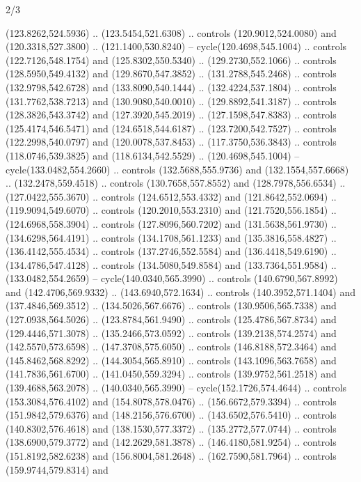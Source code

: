 \begin{flagdescription}{2/3}
\begin{scope}
\begin{scope}[xshift=0.45\flagwidth*\stretchfactor]
\begin{scope}[xshift=-0.45\flagwidth,yshift=\flagwidth,scale=0.0016667\flagwidth]
\begin{scope}[y=1pt, x=1pt, yscale=-1]
  (123.8262,524.5936) .. (123.5454,521.6308) .. controls (120.9012,524.0080) and
  (120.3318,527.3800) .. (121.1400,530.8240) -- cycle(120.4698,545.1004) ..
  controls (122.7126,548.1754) and (125.8302,550.5340) .. (129.2730,552.1066) ..
  controls (128.5950,549.4132) and (129.8670,547.3852) .. (131.2788,545.2468) ..
  controls (132.9798,542.6728) and (133.8090,540.1444) .. (132.4224,537.1804) ..
  controls (131.7762,538.7213) and (130.9080,540.0010) .. (129.8892,541.3187) ..
  controls (128.3826,543.3742) and (127.3920,545.2019) .. (127.1598,547.8383) ..
  controls (125.4174,546.5471) and (124.6518,544.6187) .. (123.7200,542.7527) ..
  controls (122.2998,540.0797) and (120.0078,537.8453) .. (117.3750,536.3843) ..
  controls (118.0746,539.3825) and (118.6134,542.5529) .. (120.4698,545.1004) --
  cycle(133.0482,554.2660) .. controls (132.5688,555.9736) and
  (132.1554,557.6668) .. (132.2478,559.4518) .. controls (130.7658,557.8552) and
  (128.7978,556.6534) .. (127.0422,555.3670) .. controls (124.6512,553.4332) and
  (121.8642,552.0694) .. (119.9094,549.6070) .. controls (120.2010,553.2310) and
  (121.7520,556.1854) .. (124.6968,558.3904) .. controls (127.8096,560.7202) and
  (131.5638,561.9730) .. (134.6298,564.4191) .. controls (134.1708,561.1233) and
  (135.3816,558.4827) .. (136.4142,555.4534) .. controls (137.2746,552.5584) and
  (136.4418,549.6190) .. (134.4786,547.4128) .. controls (134.5080,549.8584) and
  (133.7364,551.9584) .. (133.0482,554.2659) -- cycle(140.0340,565.3990) ..
  controls (140.6790,567.8992) and (142.4706,569.9332) .. (143.6940,572.1634) ..
  controls (140.3952,571.1404) and (137.4846,569.3512) .. (134.5026,567.6676) ..
  controls (130.9506,565.7338) and (127.0938,564.5026) .. (123.8784,561.9490) ..
  controls (125.4786,567.8734) and (129.4446,571.3078) .. (135.2466,573.0592) ..
  controls (139.2138,574.2574) and (142.5570,573.6598) .. (147.3708,575.6050) ..
  controls (146.8188,572.3464) and (145.8462,568.8292) .. (144.3054,565.8910) ..
  controls (143.1096,563.7658) and (141.7836,561.6700) .. (141.0450,559.3294) ..
  controls (139.9752,561.2518) and (139.4688,563.2078) .. (140.0340,565.3990) --
  cycle(152.1726,574.4644) .. controls (153.3084,576.4102) and
  (154.8078,578.0476) .. (156.6672,579.3394) .. controls (151.9842,579.6376) and
  (148.2156,576.6700) .. (143.6502,576.5410) .. controls (140.8302,576.4618) and
  (138.1530,577.3372) .. (135.2772,577.0744) .. controls (138.6900,579.3772) and
  (142.2629,581.3878) .. (146.4180,581.9254) .. controls (151.8192,582.6238) and
  (156.8004,581.2648) .. (162.7590,581.7964) .. controls (159.9744,579.8314) and

\end{scope}
\end{scope}
\end{scope}
\end{scope}
\end{flagdescription}
